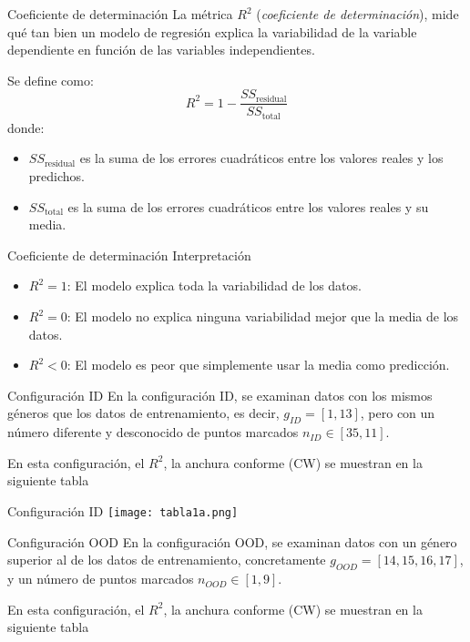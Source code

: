 \documentclass{beamer}
\begin{document}
\begin{frame}{Coeficiente de determinación}
    La métrica $R^2$ (\textit{coeficiente de determinación}), mide qué tan bien un modelo de regresión explica la variabilidad de la variable dependiente en función de las variables independientes. \newline
    \pause
    
    Se define como:  
    $$R^2 = 1 - \frac{SS_{\text{residual}}}{SS_{\text{total}}}$$
    donde:
    \begin{itemize}
        \item $SS_{\text{residual}}$ es la suma de los errores cuadráticos entre los valores reales y los predichos.
        \item $SS_{\text{total}}$ es la suma de los errores cuadráticos entre los valores reales y su media.
    \end{itemize}
\end{frame}

\begin{frame}{Coeficiente de determinación}
    Interpretación
    \begin{itemize}
        \item $R^2 = 1$: El modelo explica toda la variabilidad de los datos.
        \item $R^2 = 0$: El modelo no explica ninguna variabilidad mejor que la media de los datos.
        \item $R^2 < 0$: El modelo es peor que simplemente usar la media como predicción.
    \end{itemize}
\end{frame}


\begin{frame}{Configuración ID}
    En la configuración ID, se examinan datos con los mismos géneros que los datos de entrenamiento, es decir, $g_{ID} = [1, 13]$, pero con un número diferente y desconocido de puntos marcados $n_{ID}\in[35,11]$. 
    \newline
    \pause
    
    En esta configuración, el $R^{2}$, la anchura conforme (CW) se muestran en la siguiente tabla
\end{frame}

\begin{frame}{Configuración ID}
    \texttt{[image: tabla1a.png]}
\end{frame}

\begin{frame}{Configuración OOD}
    En la configuración OOD, se examinan datos con un género superior al de los datos de entrenamiento, concretamente $g_{OOD} = [14, 15, 16, 17]$, y un número de puntos marcados $n_{OOD}\in [1,9]$. 
    \newline
    \pause
    
    En esta configuración, el $R^{2}$, la anchura conforme (CW) se muestran en la siguiente tabla
\end{frame}
\end{document}
